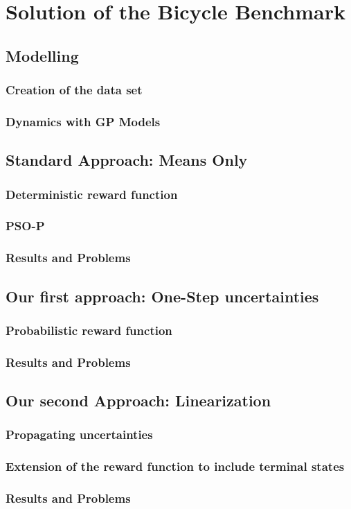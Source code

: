 \chapter{Solution of the Bicycle Benchmark}
\section{Modelling}
\subsection{Creation of the data set}
\subsection{Dynamics with GP Models}
\section{Standard Approach: Means Only}
\subsection{Deterministic reward function}
\subsection{PSO-P}
\subsection{Results and Problems}
\section{Our first approach: One-Step uncertainties}
\subsection{Probabilistic reward function}
\subsection{Results and Problems}
\section{Our second Approach: Linearization}
\subsection{Propagating uncertainties}
\subsection{Extension of the reward function to include terminal states}
\subsection{Results and Problems}
